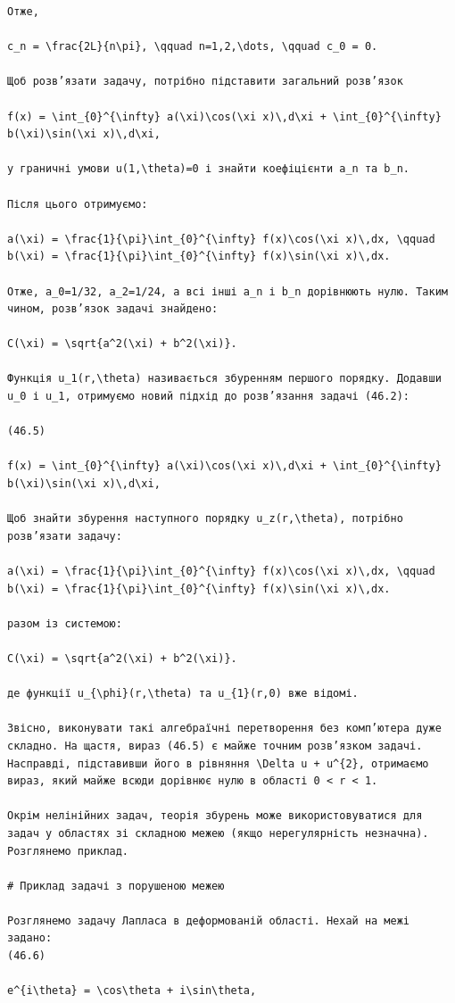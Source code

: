\documentclass[
  ukrainian,
]{article}
\begin{document}
\begin{verbatim}
Отже,

c_n = \frac{2L}{n\pi}, \qquad n=1,2,\dots, \qquad c_0 = 0.

Щоб розв’язати задачу, потрібно підставити загальний розв’язок  

f(x) = \int_{0}^{\infty} a(\xi)\cos(\xi x)\,d\xi + \int_{0}^{\infty} b(\xi)\sin(\xi x)\,d\xi,

у граничні умови u(1,\theta)=0 і знайти коефіцієнти a_n та b_n.

Після цього отримуємо:

a(\xi) = \frac{1}{\pi}\int_{0}^{\infty} f(x)\cos(\xi x)\,dx, \qquad b(\xi) = \frac{1}{\pi}\int_{0}^{\infty} f(x)\sin(\xi x)\,dx.

Отже, a_0=1/32, a_2=1/24, а всі інші a_n і b_n дорівнюють нулю. Таким чином, розв’язок задачі знайдено:

C(\xi) = \sqrt{a^2(\xi) + b^2(\xi)}.

Функція u_1(r,\theta) називається збуренням першого порядку. Додавши u_0 і u_1, отримуємо новий підхід до розв’язання задачі (46.2):

(46.5)

f(x) = \int_{0}^{\infty} a(\xi)\cos(\xi x)\,d\xi + \int_{0}^{\infty} b(\xi)\sin(\xi x)\,d\xi,

Щоб знайти збурення наступного порядку u_z(r,\theta), потрібно розв’язати задачу:

a(\xi) = \frac{1}{\pi}\int_{0}^{\infty} f(x)\cos(\xi x)\,dx, \qquad b(\xi) = \frac{1}{\pi}\int_{0}^{\infty} f(x)\sin(\xi x)\,dx.

разом із системою:

C(\xi) = \sqrt{a^2(\xi) + b^2(\xi)}.

де функції u_{\phi}(r,\theta) та u_{1}(r,0) вже відомі.

Звісно, виконувати такі алгебраїчні перетворення без комп’ютера дуже складно. На щастя, вираз (46.5) є майже точним розв’язком задачі. Насправді, підставивши його в рівняння \Delta u + u^{2}, отримаємо вираз, який майже всюди дорівнює нулю в області 0 < r < 1.

Окрім нелінійних задач, теорія збурень може використовуватися для задач у областях зі складною межею (якщо нерегулярність незначна). Розглянемо приклад.

# Приклад задачі з порушеною межею

Розглянемо задачу Лапласа в деформованій області. Нехай на межі задано:
(46.6)

e^{i\theta} = \cos\theta + i\sin\theta,


\end{verbatim}
\end{document}
